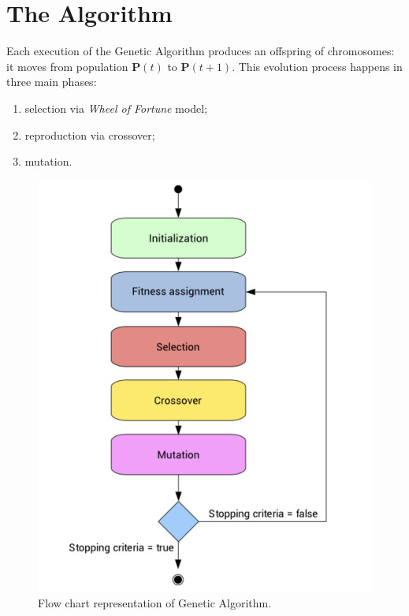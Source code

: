 \documentclass[%
    corpo=11pt,
    twoside,
    stile=classica,
    oldstyle,
    autoretitolo,
    tipotesi=magistrale,
    greek,
    evenboxes,
    english
]{toptesi}
\begin{document}
\section{The Algorithm}
Each execution of the Genetic Algorithm produces an offspring of chromosomes: it moves from  population $\textbf{P}(t)$ to $\textbf{P}(t+1)$. This evolution process happens in three main phases:
\begin{enumerate}
\item selection via \textit{Wheel of Fortune} model;
\item reproduction via crossover;
\item mutation.
\end{enumerate}
\begin{figure}[h]
\centering
\includegraphics[scale = 0.25]{pictures/genetic_algo.png}
\caption{Flow chart representation of Genetic Algorithm.}
\label{fig:artificialneuron}
\end{figure}
\end{document}
